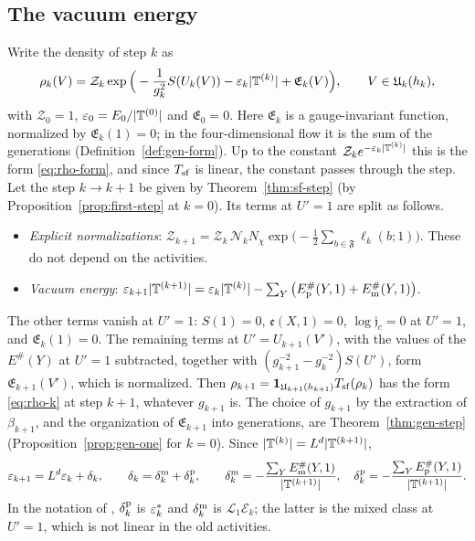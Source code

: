 \subsection{The vacuum energy}\label{subsec:tf-vacuum}

Write the density of step $k$ as
\begin{equation}\label{eq:rho-k}
\rho_k(V)=\mathcal Z_k\exp\Big(-\frac1{g_k^2}S(U_k(V))-\varepsilon_k|\mathbb T^{(k)}|+\mathfrak E_k(V)\Big),\qquad V\in\mathfrak U_k(h_k),
\end{equation}
with $\mathcal Z_0=1$, $\varepsilon_0=E_0/|\mathbb T^{(0)}|$ and $\mathfrak E_0=0$. Here $\mathfrak E_k$ is a gauge-invariant function, normalized by $\mathfrak E_k(1)=0$; in the four-dimensional flow it is the sum of the generations (Definition~\ref{def:gen-form}). Up to the constant $\mathcal Z_ke^{-\varepsilon_k|\mathbb T^{(k)}|}$ this is the form \eqref{eq:rho-form}, and since $T_{\rm sf}$ is linear, the constant passes through the step. Let the step $k\to k+1$ be given by Theorem~\ref{thm:sf-step} (by Proposition~\ref{prop:first-step} at $k=0$). Its terms at $U'=1$ are split as follows.
\begin{itemize}
\item \emph{Explicit normalizations}: $\mathcal Z_{k+1}=\mathcal Z_k\,\mathcal N_kN_\chi\exp\big(-\frac12\sum_{b\in\mathfrak F}\ell_k(b;1)\big)$. These do not depend on the activities.
\item \emph{Vacuum energy}: $\varepsilon_{k+1}|\mathbb T^{(k+1)}|=\varepsilon_k|\mathbb T^{(k)}|-\sum_Y\big(E^\#_{\rm p}(Y,1)+E^\#_{\rm m}(Y,1)\big)$.
\end{itemize}
The other terms vanish at $U'=1$: $S(1)=0$, $\mathfrak e(X,1)=0$, $\log\mathfrak j_c=0$ at $U'=1$, and $\mathfrak E_k(1)=0$. The remaining terms at $U'=U_{k+1}(V')$, with the values of the $E^\#(Y)$ at $U'=1$ subtracted, together with $(g_{k+1}^{-2}-g_k^{-2})S(U')$, form $\mathfrak E_{k+1}(V')$, which is normalized. Then $\rho_{k+1}=\mathbf 1_{\mathfrak U_{k+1}(h_{k+1})}T_{\rm sf}(\rho_k)$ has the form \eqref{eq:rho-k} at step $k+1$, whatever $g_{k+1}$ is. The choice of $g_{k+1}$ by the extraction of $\beta_{k+1}$, and the organization of $\mathfrak E_{k+1}$ into generations, are Theorem~\ref{thm:gen-step} (Proposition~\ref{prop:gen-one} for $k=0$). Since $|\mathbb T^{(k)}|=L^d|\mathbb T^{(k+1)}|$,
\begin{equation}\label{eq:vacuum-flow}
\varepsilon_{k+1}=L^d\varepsilon_k+\delta_k,\qquad\delta_k=\delta^{\rm m}_k+\delta^{\rm p}_k,\qquad\delta^{\rm m}_k=-\frac{\sum_YE^\#_{\rm m}(Y,1)}{|\mathbb T^{(k+1)}|},\quad\delta^{\rm p}_k=-\frac{\sum_YE^\#_{\rm p}(Y,1)}{|\mathbb T^{(k+1)}|}.
\end{equation}
In the notation of \cite{DimockI}, $\delta^{\rm p}_k$ is $\varepsilon^*_k$ and $\delta^{\rm m}_k$ is $\mathcal L_1\mathcal E_k$; the latter is the mixed class at $U'=1$, which is not linear in the old activities.

